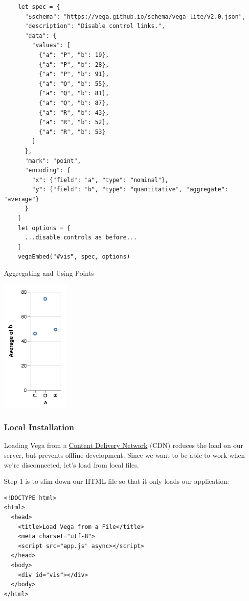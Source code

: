 \begin{verbatim}
    let spec = {
      "$schema": "https://vega.github.io/schema/vega-lite/v2.0.json",
      "description": "Disable control links.",
      "data": {
        "values": [
          {"a": "P", "b": 19},
          {"a": "P", "b": 28},
          {"a": "P", "b": 91},
          {"a": "Q", "b": 55},
          {"a": "Q", "b": 81},
          {"a": "Q", "b": 87},
          {"a": "R", "b": 43},
          {"a": "R", "b": 52},
          {"a": "R", "b": 53}
        ]
      },
      "mark": "point",
      "encoding": {
        "x": {"field": "a", "type": "nominal"},
        "y": {"field": "b", "type": "quantitative", "aggregate": "average"}
      }
    }
    let options = {
      ...disable controls as before...
    }
    vegaEmbed("#vis", spec, options)
\end{verbatim}

Aggregating and Using Points

\includegraphics{../../files/vis-aggregate-points.png}

\subsubsection{Local Installation}\label{s:vis-vega-local}

Loading Vega from a \protect\hyperlink{g:cdn}{Content Delivery Network}
(CDN) reduces the load on our server, but prevents offline development.
Since we want to be able to work when we're disconnected, let's load
from local files.

Step 1 is to slim down our HTML file so that it only loads our
application:

\begin{verbatim}
<!DOCTYPE html>
<html>
  <head>
    <title>Load Vega from a File</title>
    <meta charset="utf-8">
    <script src="app.js" async></script>
  </head>
  <body>
    <div id="vis"></div>
  </body>
</html>
\end{verbatim}

